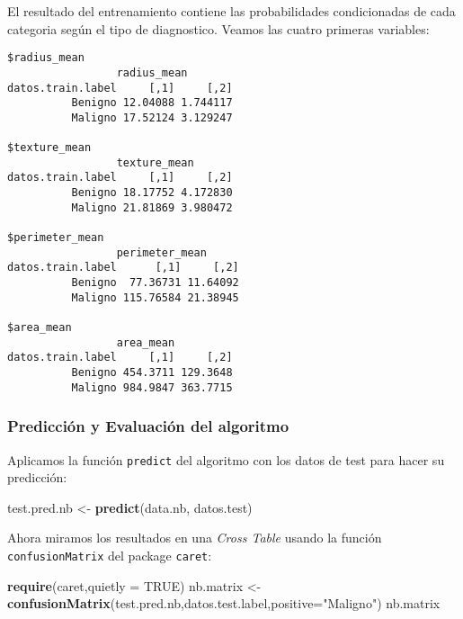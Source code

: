 \documentclass[
]{article}
\newenvironment{Shaded}{\begin{snugshade}}{\end{snugshade}}
\newcommand{\DataTypeTok}[1]{\textcolor[rgb]{0.13,0.29,0.53}{#1}}
\newcommand{\DecValTok}[1]{\textcolor[rgb]{0.00,0.00,0.81}{#1}}
\newcommand{\KeywordTok}[1]{\textcolor[rgb]{0.13,0.29,0.53}{\textbf{#1}}}
\newcommand{\NormalTok}[1]{#1}
\newcommand{\OperatorTok}[1]{\textcolor[rgb]{0.81,0.36,0.00}{\textbf{#1}}}
\newcommand{\OtherTok}[1]{\textcolor[rgb]{0.56,0.35,0.01}{#1}}
\newcommand{\StringTok}[1]{\textcolor[rgb]{0.31,0.60,0.02}{#1}}
\begin{document}
El resultado del entrenamiento contiene las probabilidades condicionadas
de cada categoria según el tipo de diagnostico. Veamos las cuatro
primeras variables:

\begin{Shaded}
\end{Shaded}

\begin{verbatim}
$radius_mean
                 radius_mean
datos.train.label     [,1]     [,2]
          Benigno 12.04088 1.744117
          Maligno 17.52124 3.129247

$texture_mean
                 texture_mean
datos.train.label     [,1]     [,2]
          Benigno 18.17752 4.172830
          Maligno 21.81869 3.980472

$perimeter_mean
                 perimeter_mean
datos.train.label      [,1]     [,2]
          Benigno  77.36731 11.64092
          Maligno 115.76584 21.38945

$area_mean
                 area_mean
datos.train.label     [,1]     [,2]
          Benigno 454.3711 129.3648
          Maligno 984.9847 363.7715
\end{verbatim}

\hypertarget{predicciuxf3n-y-evaluaciuxf3n-del-algoritmo-1}{%
\subsubsection{Predicción y Evaluación del
algoritmo}\label{predicciuxf3n-y-evaluaciuxf3n-del-algoritmo-1}}

Aplicamos la función \texttt{predict} del algoritmo con los datos de
test para hacer su predicción:

\begin{Shaded}
\begin{Highlighting}[]
\NormalTok{test.pred.nb <-}\StringTok{ }\KeywordTok{predict}\NormalTok{(data.nb, datos.test)}
\end{Highlighting}
\end{Shaded}

Ahora miramos los resultados en una \emph{Cross Table} usando la función
\texttt{confusionMatrix} del package \texttt{caret}:

\begin{Shaded}
\begin{Highlighting}[]
\KeywordTok{require}\NormalTok{(caret,}\DataTypeTok{quietly =} \OtherTok{TRUE}\NormalTok{)}
\NormalTok{nb.matrix <-}\StringTok{ }\KeywordTok{confusionMatrix}\NormalTok{(test.pred.nb,datos.test.label,}\DataTypeTok{positive=}\StringTok{"Maligno"}\NormalTok{)}
\NormalTok{nb.matrix}
\end{Highlighting}
\end{Shaded}
\end{document}
